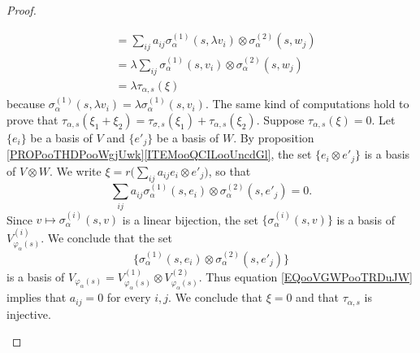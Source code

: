 \begin{proof}
\begin{subproof}
\begin{subproof}
\begin{subequations}
\begin{align}
					                            & =\sum_{ij}a_{ij}\sigma_{\alpha}^{(1)}(s,\lambda v_i)\otimes \sigma_{\alpha}^{(2)}(s,w_j) \\
					                            & =\lambda\sum_{ij}\sigma_{\alpha}^{(1)}(s,v_i)\otimes \sigma_{\alpha}^{(2)}(s,w_j)        \\
					                            & =\lambda\tau_{\alpha,s}(\xi)
				\end{align}
			\end{subequations}
			because \( \sigma_{\alpha}^{(1)}(s,\lambda v_i)=\lambda\sigma_{\alpha}^{(1)}(s,v_i)\). The same kind of computations hold to prove that \( \tau_{\alpha,s}(\xi_1+\xi_2)=\tau_{\sigma,s}(\xi_1)+\tau_{\alpha,s}(\xi_2)\).
			\spitem[Injective]
			Suppose \( \tau_{\alpha,s}(\xi)=0\). Let \( \{e_i\}\) be a basis of \( V\) and \( \{e'_j\}\) be a basis of \( W\). By proposition \ref{PROPooTHDPooWgjUwk}\ref{ITEMooQCILooUncdGl}, the set \( \{e_i\otimes e'_j\}\) is a basis of \( V\otimes W\). We write \( \xi=r\big( \sum_{ij}a_{ij}e_i\otimes e'_j \big)\), so that
			\begin{equation}		\label{EQooVGWPooTRDuJW}
				\sum_{ij}a_{ij}\sigma_{\alpha}^{(1)}(s,e_i)\otimes \sigma_{\alpha}^{(2)}(s,e'_j)=0.
			\end{equation}
			Since \( v\mapsto \sigma_{\alpha}^{(i)}(s,v)\) is a linear bijection, the set \( \{ \sigma_{\alpha}^{(i)}(s,v) \}\) is a basis of \( V_{\varphi_{\alpha}(s)}^{(i)}\). We conclude that the set
			\begin{equation}
				\{ \sigma_{\alpha}^{(1)}(s,e_i)\otimes \sigma_{\alpha}^{(2)}(s,e'_j) \}
			\end{equation}
			is a basis of \( V_{\varphi_{\alpha}(s)}=V_{\varphi_{\alpha}(s)}^{(1)}\otimes V_{\varphi_{\alpha}(s)}^{(2)}\). Thus equation \eqref{EQooVGWPooTRDuJW} implies that \( a_{ij}=0\) for every \( i,j\). We conclude that \( \xi=0\) and that \( \tau_{\alpha,s}\) is injective.


\end{subproof}
\end{subproof}
\end{proof}
